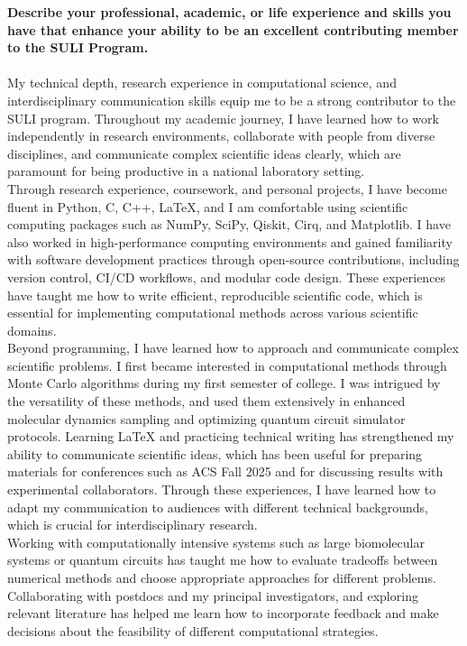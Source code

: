 \documentclass{article}
\begin{document}
\noindent\textbf{Describe your professional, academic, or life experience and skills you have that enhance your ability to be an excellent contributing member to the SULI Program.}
\\\\
My technical depth, research experience in computational science, 
and interdisciplinary communication skills equip me to be a strong contributor 
to the SULI program. Throughout my academic journey, I have learned how to work independently 
in research environments, collaborate with people from diverse disciplines, and 
communicate complex scientific ideas clearly, which are paramount for 
being productive in a national laboratory setting.
\\

Through research experience, coursework, and personal projects, I have become fluent in 
Python, C, C++, LaTeX, and I am comfortable using scientific computing packages such as 
NumPy, SciPy, Qiskit, Cirq, and Matplotlib. I have also worked in high-performance 
computing environments and gained familiarity with software development 
practices through open-source contributions, including 
version control, CI/CD workflows, and modular code design. These experiences have 
taught me how to write efficient, reproducible scientific code, which is essential for implementing 
computational methods across various scientific domains.
\\

Beyond programming, I have learned how to approach and 
communicate complex scientific problems. I first became interested in computational 
methods through Monte Carlo algorithms during my first semester of college. I was intrigued
by the versatility of these methods, and used them extensively in enhanced molecular 
dynamics sampling and optimizing quantum circuit simulator protocols.  Learning LaTeX
and practicing technical writing has strengthened my ability to communicate scientific 
ideas, which has been useful for preparing materials for conferences such as ACS Fall 2025 and for 
discussing results with experimental collaborators. Through these experiences, I have learned how to 
adapt my communication to audiences with different technical backgrounds, which is crucial for interdisciplinary 
research. 
\\

Working with computationally intensive systems such as large biomolecular systems or 
quantum circuits has taught me how to evaluate tradeoffs between numerical methods and 
choose appropriate approaches for different problems. Collaborating with 
postdocs and my principal investigators, and exploring relevant literature 
has helped me learn how to incorporate feedback and make decisions about the 
feasibility of different computational strategies. 
\\
\end{document}
